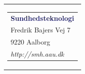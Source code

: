 


% 
\thispagestyle{empty}
\begin{nopagebreak}
{\samepage 	
	
\begin{flushright}
\begin{tabular}{r}
\parbox{\textwidth}{  
\hfill \hspace{2cm} \parbox{8cm}{\begin{tabular}{l} %
{\small \textbf{\textcolor{MidnightBlue}{Sundhedsteknologi}}}\\ 
{\small \textcolor{NavyBlue}{Fredrik Bajers Vej 7}} \\
{\small \textcolor{NavyBlue}{9220 Aalborg}} \\
{\small \textcolor{NavyBlue}{\emph{http://smh.aau.dk}}}
\end{tabular}}}
\end{tabular}
\end{flushright}


}
\end{nopagebreak}
